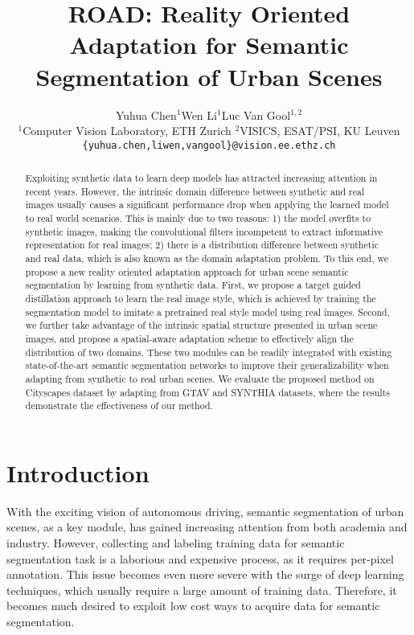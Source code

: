 \documentclass[10pt,twocolumn,letterpaper]{article}
\begin{document}
\title{ROAD: Reality Oriented Adaptation for Semantic Segmentation of Urban Scenes}

\author{Yuhua Chen$^1$\hspace{10mm}Wen Li$^1$\hspace{10mm}Luc Van Gool$^{1,2}$\\[2mm]
$^1$Computer Vision Laboratory, ETH Zurich\hspace{10mm}
$^2$VISICS, ESAT/PSI, KU Leuven\\[-1.5pt]
{\tt\small \{yuhua.chen,liwen,vangool\}@vision.ee.ethz.ch}
}

\maketitle


\begin{abstract}

Exploiting synthetic data to learn deep models has attracted increasing attention in recent years. However, the intrinsic domain difference between synthetic and real images usually causes a significant performance drop when applying the learned model to real world scenarios. This is mainly due to two reasons: 1) the model overfits to synthetic images, making the convolutional filters incompetent to extract informative representation for real images; 2) there is a distribution difference between synthetic and real data, which is also known as the domain adaptation problem. To this end, we propose a new reality oriented adaptation approach for urban scene semantic segmentation by learning from synthetic data. First, we propose a target guided distillation approach to learn the real image style, which is achieved by training the segmentation model to imitate a pretrained real style model using real images. Second, we further take advantage of the intrinsic spatial structure presented in urban scene images, and propose a spatial-aware adaptation scheme to effectively align the distribution of two domains. These two modules can be readily integrated with existing state-of-the-art semantic segmentation networks to improve their generalizability when adapting from synthetic to real urban scenes. We evaluate the proposed method on Cityscapes dataset by adapting from GTAV and SYNTHIA datasets, where the results demonstrate the effectiveness of our method.
\end{abstract}

\vspace{-2mm}
\section{Introduction}
With the exciting vision of autonomous driving, semantic segmentation of urban scenes, as a key module, has gained increasing attention from both academia and industry. However, collecting and labeling training data for semantic segmentation task is a laborious and expensive process, as it requires per-pixel annotation. This issue becomes even more severe with the surge of deep learning techniques, which usually require a large amount of training data. Therefore, it becomes much desired to exploit low cost ways to acquire data for semantic segmentation.
\end{document}

